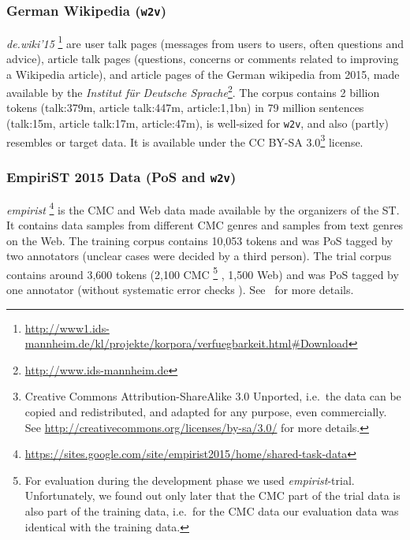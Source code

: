 \documentclass[11pt]{article}
\newcommand\wtv{\texttt{w2v}\xspace}
\begin{document}
\subsubsection{German Wikipedia (\wtv)} %
\emph{de.wiki'15}%
\footnote{\url{http://www1.ids-mannheim.de/kl/projekte/korpora/verfuegbarkeit.html\#Download}}
are user talk pages (messages from users to users, often questions and advice),
article talk pages (questions, concerns or comments related to improving a
Wikipedia article), and article pages of the German wikipedia from 2015, made
available by the \emph{Institut f\"{u}r Deutsche
Sprache}\footnote{\url{http://www.ids-mannheim.de}}.
The corpus contains 2 billion tokens 
(talk:379m, article talk:447m, article:1,1bn) 
in 79 million sentences 
(talk:15m, article talk:17m, article:47m), is well-sized for \wtv, and
also (partly) resembles or target data.
It is available under the CC BY-SA 3.0\footnote{Creative Commons
Attribution-ShareAlike 3.0 Unported, i.e.~the data can be copied and
redistributed, and adapted for any purpose, even commercially. See
\url{http://creativecommons.org/licenses/by-sa/3.0/} for more details.}
license.


\subsubsection{EmpiriST 2015 Data (PoS and \wtv)} %
\label{subsec:empirist}
\emph{empirist}%
\footnote{\url{https://sites.google.com/site/empirist2015/home/shared-task-data}}
is the CMC and Web data made available by the organizers of the ST.
It contains data samples from different CMC genres and samples from text genres
on the Web.
The training corpus contains 10,053 tokens and was PoS tagged by two annotators
(unclear cases were decided by a third person). 
The trial corpus contains around 3,600 tokens (2,100 CMC%
\footnote{For evaluation during the development phase we used
    \emph{empirist}-trial.
    Unfortunately, we found out only later that the CMC part of the trial data
    is also part of the training data, i.e.~for the CMC data our evaluation
    data was identical with the training data.}%
, 1,500 Web) and was PoS tagged by one annotator (without systematic error
checks%
).
See~ for more details.
\end{document}

